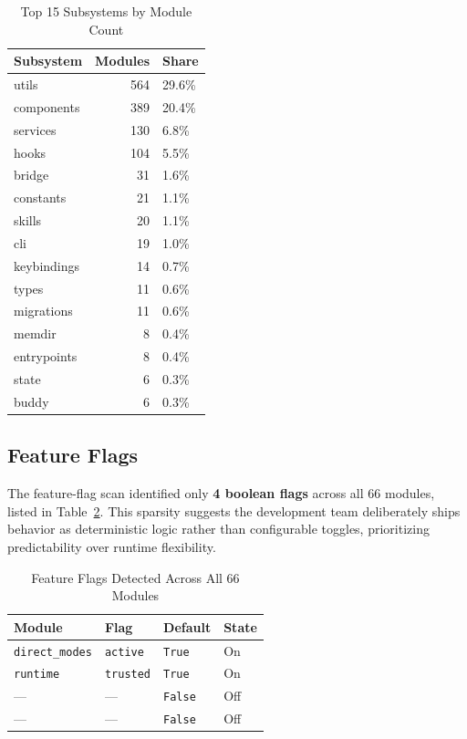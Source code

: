 \documentclass[conference]{IEEEtran}
\begin{document}
\begin{table}[!t]
  \renewcommand{\arraystretch}{1.25}
  \caption{Top 15 Subsystems by Module Count}
  \label{tab:subsystems}
  \centering
  \begin{tabular}{@{}lrl@{}}
    \toprule
    \textbf{Subsystem} & \textbf{Modules} & \textbf{Share} \\
    \midrule
    utils       & 564 & 29.6\% \\
    components  & 389 & 20.4\% \\
    services    & 130 &  6.8\% \\
    hooks       & 104 &  5.5\% \\
    bridge      &  31 &  1.6\% \\
    constants   &  21 &  1.1\% \\
    skills      &  20 &  1.1\% \\
    cli         &  19 &  1.0\% \\
    keybindings &  14 &  0.7\% \\
    types       &  11 &  0.6\% \\
    migrations  &  11 &  0.6\% \\
    memdir      &   8 &  0.4\% \\
    entrypoints &   8 &  0.4\% \\
    state       &   6 &  0.3\% \\
    buddy       &   6 &  0.3\% \\
    \bottomrule
  \end{tabular}
\end{table}

\subsection{Feature Flags}

The feature-flag scan identified only \textbf{4 boolean flags} across
all 66 modules, listed in Table~\ref{tab:flags}. This sparsity
suggests the development team deliberately ships behavior as
deterministic logic rather than configurable toggles, prioritizing
predictability over runtime flexibility.

\begin{table}[!t]
  \renewcommand{\arraystretch}{1.25}
  \caption{Feature Flags Detected Across All 66 Modules}
  \label{tab:flags}
  \centering
  \begin{tabular}{@{}llll@{}}
    \toprule
    \textbf{Module}         & \textbf{Flag}    & \textbf{Default}    & \textbf{State} \\
    \midrule
    \texttt{direct\_modes}  & \texttt{active}  & \texttt{True}       & On  \\
    \texttt{runtime}        & \texttt{trusted} & \texttt{True}       & On  \\
    ---                     & ---              & \texttt{False}      & Off \\
    ---                     & ---              & \texttt{False}      & Off \\
    \bottomrule
  \end{tabular}
\end{table}
\end{document}
